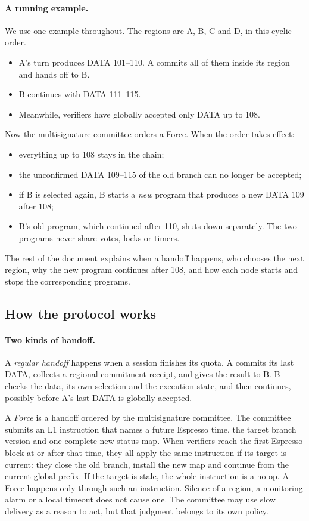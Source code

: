 \documentclass[11pt,a4paper]{article}
\newcommand{\defterm}[1]{\textcolor{rrBlue}{\textit{#1}}}
\newcounter{protocol}
\begin{document}
\paragraph{A running example.}
We use one example throughout. The regions are A, B, C and D, in this
cyclic order.
\begin{itemize}
\item A's turn produces DATA 101--110. A commits all of them inside its
region and hands off to B.
\item B continues with DATA 111--115.
\item Meanwhile, verifiers have globally accepted only DATA up to 108.
\end{itemize}
Now the multisignature committee orders a Force. When the order takes
effect:
\begin{itemize}
\item everything up to 108 stays in the chain;
\item the unconfirmed DATA 109--115 of the old branch can no longer be
accepted;
\item if B is selected again, B starts a \emph{new} program that produces
a new DATA 109 after 108;
\item B's old program, which continued after 110, shuts down separately.
The two programs never share votes, locks or timers.
\end{itemize}
The rest of the document explains when a handoff happens, who chooses
the next region, why the new program continues after 108, and how each
node starts and stops the corresponding programs.

\subsection{How the protocol works}
\paragraph{Two kinds of handoff.}
A \defterm{regular handoff} happens when a session finishes its quota.
A commits its last DATA, collects a regional commitment receipt, and
gives the result to B. B checks the data, its own selection and the
execution state, and then continues, possibly before A's last
DATA is globally accepted.

A \defterm{Force} is a handoff ordered by the multisignature committee.
The committee submits an L1 instruction that names a future Espresso
time, the target branch version and one complete new status map. When
verifiers reach the first Espresso block at or after that time, they all
apply the same instruction if its target is current: they close the old
branch, install the new map and continue from the current global prefix.
If the target is stale, the whole instruction is a no-op. A Force happens only
through such an instruction. Silence of a region, a monitoring alarm or
a local timeout does not cause one. The committee may use slow delivery
as a reason to act, but that judgment belongs to its own policy.
\end{document}
